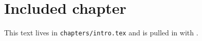 \section{Included chapter}
This text lives in \texttt{chapters/intro.tex} and is pulled in with \verb||.
